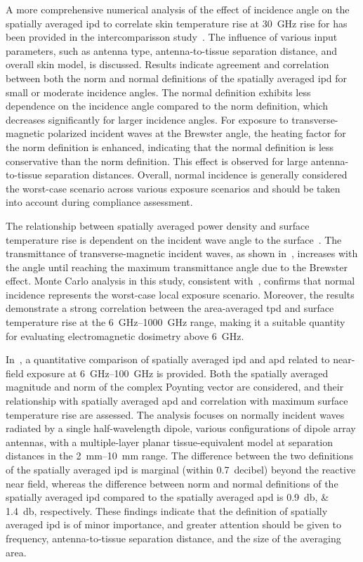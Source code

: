 A more comprehensive numerical analysis of the effect of incidence angle on the spatially averaged \gls{ipd} to correlate skin temperature rise at \SI{30}{\GHz} rise for has been provided in the intercomparisson study~\cite{Diao2021Effect}.
The influence of various input parameters, such as antenna type, antenna-to-tissue separation distance, and overall skin model, is discussed.
Results indicate agreement and correlation between both the norm and normal definitions of the spatially averaged \gls{ipd} for small or moderate incidence angles.
The normal definition exhibits less dependence on the incidence angle compared to the norm definition, which decreases significantly for larger incidence angles.
For exposure to transverse-magnetic polarized incident waves at the Brewster angle, the heating factor for the norm definition is enhanced, indicating that the normal definition is less conservative than the norm definition.
This effect is observed for large antenna-to-tissue separation distances.
Overall, normal incidence is generally considered the worst-case scenario across various exposure scenarios and should be taken into account during compliance assessment.

The relationship between spatially averaged power density and surface temperature rise is dependent on the incident wave angle to the surface~\cite{Hirata2021Assessment}.
The transmittance of transverse-magnetic incident waves, as shown in~\cite{Li2019Relationship}, increases with the angle until reaching the maximum transmittance angle due to the Brewster effect.
Monte Carlo analysis in this study, consistent with~\cite{Diao2021Effect}, confirms that normal incidence represents the worst-case local exposure scenario.
Moreover, the results demonstrate a strong correlation between the area-averaged \gls{tpd} and surface temperature rise at the \SIrange{6}{1000}{\GHz} range, making it a suitable quantity for evaluating electromagnetic dosimetry above \SI{6}{\GHz}.

In~\cite{Li2021Quantitative}, a quantitative comparison of spatially averaged \gls{ipd} and \gls{apd} related to near-field exposure at \SIrange{6}{100}{\GHz} is provided.
Both the spatially averaged magnitude and norm of the complex Poynting vector are considered, and their relationship with spatially averaged \gls{apd} and correlation with maximum surface temperature rise are assessed.
The analysis focuses on normally incident waves radiated by a single half-wavelength dipole, various configurations of dipole array antennas, with a multiple-layer planar tissue-equivalent model at separation distances in the \SIrange{2}{10}{\mm} range.
The difference between the two definitions of the spatially averaged \gls{ipd} is marginal (within \SI{0.7}{decibel}) beyond the reactive near field, whereas the difference between norm and normal definitions of the spatially averaged \gls{ipd} compared to the spatially averaged \gls{apd} is \SIlist{0.9;1.4}{\decibel}, respectively.
These findings indicate that the definition of spatially averaged \gls{ipd} is of minor importance, and greater attention should be given to frequency, antenna-to-tissue separation distance, and the size of the averaging area.

